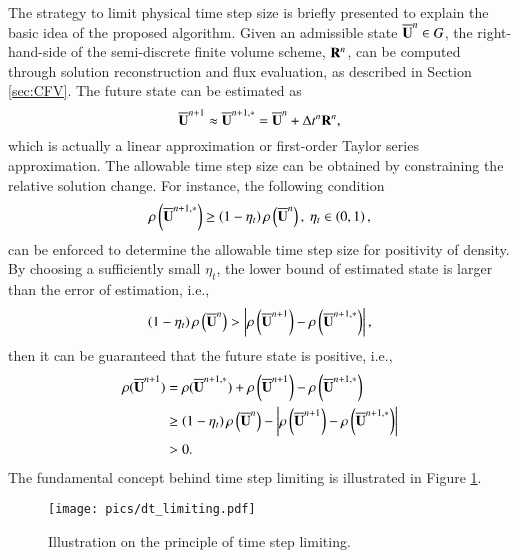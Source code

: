 The strategy to limit physical time step size is briefly presented to explain the basic idea of the proposed algorithm. Given an admissible state $\overline{\mathbf{U}}^n \in G$, the right-hand-side of the semi-discrete finite volume scheme, $\mathbf{R}^n$, can be computed through solution reconstruction and flux evaluation, as described in Section \ref{sec:CFV}. The future state can be estimated as
\begin{equation}
    \overline{\mathbf{U}}^{n+1} \approx \overline{\mathbf{U}}^{n+1,*}=\overline{\mathbf{U}}^n + \mathrm\Delta t^n \mathbf{R}^n,
\end{equation}
which is actually a linear approximation or first-order Taylor series approximation. The allowable time step size can be obtained by constraining the relative solution change. For instance, the following condition
\begin{equation}
    \rho \left(\overline{\mathbf{U}}^{n+1,*}\right) \geq \left(1-\eta_t \right) \rho \left(\overline{\mathbf{U}}^n\right), \ \eta_t \in \left(0,1\right),
\end{equation}
can be enforced to determine the allowable time step size for positivity of density. By choosing a sufficiently small $\eta_t$, the lower bound of estimated state is larger than the error of estimation, i.e.,
\begin{equation}
    \left(1-\eta_t \right) \rho \left(\overline{\mathbf{U}}^n\right) > \left|\rho\left(\overline{\mathbf{U}}^{n+1}\right)-\rho\left(\overline{\mathbf{U}}^{n+1,*}\right) \right|,
\end{equation}
then it can be guaranteed that the future state is positive, i.e.,
\begin{equation}
\begin{aligned}
    \rho(\overline{\mathbf{U}}^{n+1}) &= \rho(\overline{\mathbf{U}}^{n+1,*}) + \rho\left(\overline{\mathbf{U}}^{n+1}\right)-\rho\left(\overline{\mathbf{U}}^{n+1,*}\right)  \\
    &\geq \left(1-\eta_t \right) \rho \left(\overline{\mathbf{U}}^n\right) - 
    \left|\rho\left(\overline{\mathbf{U}}^{n+1}\right)-\rho\left(\overline{\mathbf{U}}^{n+1,*}\right) \right| \\
    &>0.
\end{aligned}
\end{equation}
The fundamental concept behind time step limiting is illustrated in Figure \ref{fig:dt_limiting}.

\begin{figure}[htbp!]
    \centering
    \texttt{[image: pics/dt\_limiting.pdf]}
    \caption{Illustration on the principle of time step limiting.}
    \label{fig:dt_limiting}
\end{figure}

